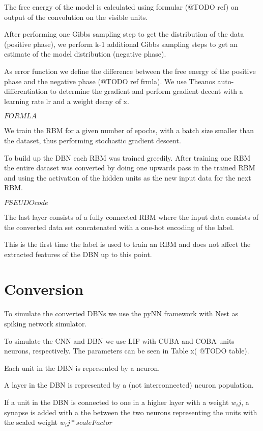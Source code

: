 The free energy of the model is calculated using formular (@TODO ref) on output of the convolution on the visible units.

After performing one Gibbs sampling step to get the distribution of the data (positive phase), we perform k-1 additional Gibbs sampling steps to get an estimate of the model distribution (negative phase).

As error function we define the difference between the free energy of the positive phase and the negative phase (@TODO ref frmla).
We use Theanos auto-differentiation to determine the gradient and perform gradient decent with a learning rate lr and a weight decay of x.

$FORMLA$

We train the RBM for a given number of epochs, with a batch size smaller than the dataset, thus performing stochastic gradient descent.

To build up the DBN each RBM was trained greedily.
After training one RBM the entire dataset was converted by doing one upwards pass in the trained RBM and using the activation of the hidden units as the new input data for the next RBM.

$PSEUDO code$

The last layer consists of a fully connected RBM where the input data consists of the converted data set concatenated with a one-hot encoding of the label.

This is the first time the label is used to train an RBM and does not affect the extracted features of the DBN up to this point.  

\section{Conversion}

To simulate the converted DBNs we use the pyNN framework with Nest as spiking network simulator.

To simulate the CNN and DBN we use LIF with CUBA and COBA units neurons, respectively.
The parameters can be seen in Table x( @TODO table).

Each unit in the DBN is represented by a neuron. 

A layer in the DBN is represented by a (not interconnected) neuron population.

If a unit in the DBN is connected to one in a higher layer with a weight $w_ij$, a synapse is added with a the between the two neurons representing the units with the scaled weight $w_ij * scaleFactor$

